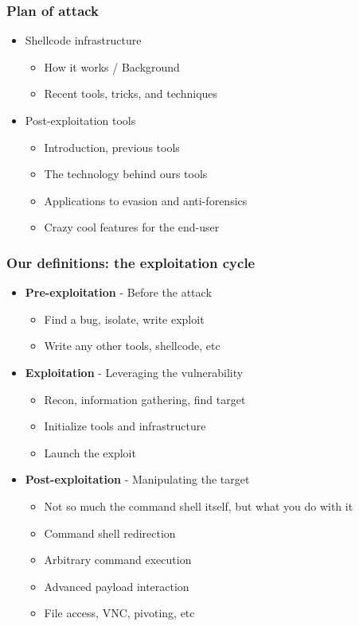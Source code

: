 \documentclass{beamer}
\newenvironment{sitemize}{\vspace{1mm}\begin{itemize}\itemsep 4pt\small}{\end{itemize}}
\begin{document}
\begin{frame}[t]
  \frametitle{Plan of attack}
  \begin{sitemize}
    \item Shellcode infrastructure
    \begin{sitemize}
      \item How it works / Background
      \item Recent tools, tricks, and techniques
    \end{sitemize}
    \item Post-exploitation tools
    \begin{sitemize}
      \item Introduction, previous tools
      \item The technology behind ours tools
      \item Applications to evasion and anti-forensics
      \item Crazy cool features for the end-user
    \end{sitemize}
  \end{sitemize}
\end{frame}

\begin{frame}[t]
    \frametitle{Our definitions: the exploitation cycle}

    \begin{sitemize}
        \item \textbf{Pre-exploitation} - Before the attack
        \begin{sitemize}
            \item Find a bug, isolate, write exploit
	    \item Write any other tools, shellcode, etc
        \end{sitemize}

        \pause
        \item \textbf{Exploitation} - Leveraging the vulnerability
        \begin{sitemize}
	    \item Recon, information gathering, find target
            \item Initialize tools and infrastructure
            \item Launch the exploit
        \end{sitemize}

        \pause
        \item \textbf{Post-exploitation} - Manipulating the target
        \begin{sitemize}
	    \item Not so much the command shell itself, but what you do with it
            \item Command shell redirection
            \item Arbitrary command execution
            \item Advanced payload interaction
	    \item File access, VNC, pivoting, etc
        \end{sitemize}
    \end{sitemize}
\end{frame}
\end{document}
